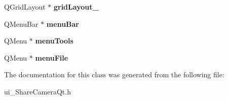 \begin{DoxyCompactItemize}
\item 
\hypertarget{class_ui___share_camera_qt_a3d43945a1d94bcaefcc4b37e632178c3}{Q\-Grid\-Layout $\ast$ {\bfseries grid\-Layout\-\_}}\label{class_ui___share_camera_qt_a3d43945a1d94bcaefcc4b37e632178c3}

\item 
\hypertarget{class_ui___share_camera_qt_a01f32c31af5a0f64969e5ff74d4458b4}{Q\-Menu\-Bar $\ast$ {\bfseries menu\-Bar}}\label{class_ui___share_camera_qt_a01f32c31af5a0f64969e5ff74d4458b4}

\item 
\hypertarget{class_ui___share_camera_qt_aec2d7a0aa948c06e501ae9892506196c}{Q\-Menu $\ast$ {\bfseries menu\-Tools}}\label{class_ui___share_camera_qt_aec2d7a0aa948c06e501ae9892506196c}

\item 
\hypertarget{class_ui___share_camera_qt_a55a8d91377f9ed2fc494c0c864534b6a}{Q\-Menu $\ast$ {\bfseries menu\-File}}\label{class_ui___share_camera_qt_a55a8d91377f9ed2fc494c0c864534b6a}

\end{DoxyCompactItemize}


The documentation for this class was generated from the following file\-:\begin{DoxyCompactItemize}
\item 
ui\-\_\-\-Share\-Camera\-Qt.\-h\end{DoxyCompactItemize}
